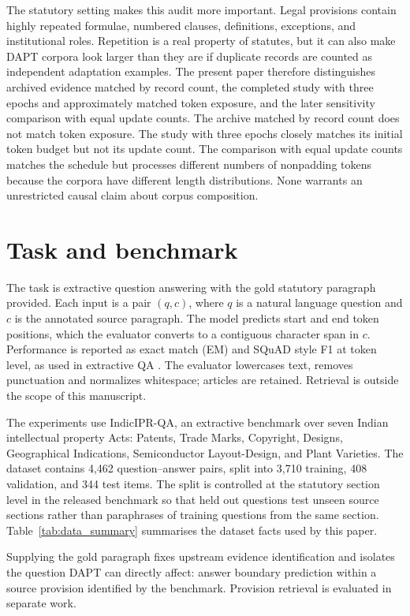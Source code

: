 \documentclass[pdflatex,sn-basic]{sn-jnl}
\begin{document}
The statutory setting makes this audit more important. Legal provisions contain
highly repeated formulae, numbered clauses, definitions, exceptions, and
institutional roles. Repetition is a real property of statutes, but it can also
make DAPT corpora look larger than they are if duplicate records are counted as
independent adaptation examples. The present paper therefore distinguishes
archived evidence matched by record count, the completed study with three
epochs and approximately matched token exposure, and the later sensitivity
comparison with equal update counts. The archive matched by record count does
not match token exposure. The study with three epochs
closely matches its initial token budget but not its update count. The
comparison with equal update counts matches the schedule but processes different
numbers of nonpadding tokens because the corpora have different length
distributions. None warrants an unrestricted causal claim about corpus
composition.


\section{Task and benchmark}\label{sec:task}

The task is extractive question answering with the gold statutory paragraph
provided. Each input is a pair \((q,c)\), where \(q\) is a natural language
question and \(c\) is the annotated source paragraph. The model predicts start
and end token positions, which the evaluator converts to a contiguous character
span in \(c\). Performance is reported as exact match (EM) and SQuAD style F1
at token level, as used in extractive QA
\citep{rajpurkarSQuAD100000Questions2016}. The evaluator lowercases text,
removes punctuation and normalizes whitespace; articles are retained.
Retrieval is outside the scope of
this manuscript.

The experiments use IndicIPR-QA, an extractive benchmark over seven Indian
intellectual property Acts: Patents, Trade Marks, Copyright, Designs,
Geographical Indications, Semiconductor Layout-Design, and Plant Varieties.
The dataset contains 4,462 question--answer pairs,
split into 3,710 training, 408 validation, and 344 test items. The split is
controlled at the statutory section level in the released benchmark so that
held out questions test unseen source sections rather than paraphrases of
training questions from the same section. Table~\ref{tab:data_summary}
summarises the dataset facts used by this paper.

Supplying the gold paragraph fixes upstream evidence identification and isolates
the question DAPT can directly affect: answer boundary prediction within a
source provision identified by the benchmark. Provision retrieval is evaluated
in separate work.
\end{document}
